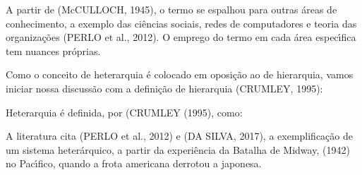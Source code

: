 \documentclass[
12pt,		%
openright,	%
twoside,  %
a4paper,			%
chapter=TITLE,		%
english,			%
french,				%
spanish,			%
brazil				%
]{USPSC-classe/USPSC}
\begin{document}
A partir de (McCULLOCH, 1945), o termo se espalhou para outras \'areas de conhecimento, a exemplo das ci\^encias sociais, redes de computadores e teoria das organiza\c{c}\~oes (PERLO et al., 2012). O emprego do termo em cada \'area espec\'{\i}fica tem nuances pr\'oprias.

















Como o conceito de heterarquia \'e colocado em oposi\c{c}\~ao ao de hierarquia, vamos iniciar nossa discuss\~ao com a defini\c{c}\~ao de hierarquia (CRUMLEY, 1995):


















\noindent\begin{center}\mbox{\centering{}}\end{center}


Heterarquia \'e definida, por (CRUMLEY (1995), como:


















\noindent\begin{center}\mbox{\centering{}}\end{center}


A literatura cita (PERLO et al., 2012) e (DA SILVA, 2017), a exemplifica\c{c}\~ao de um sistema heter\'arquico, a partir da experi\^encia da Batalha de Midway, (1942) no Pac\'{\i}fico, quando a frota americana derrotou a japonesa.
\end{document}
